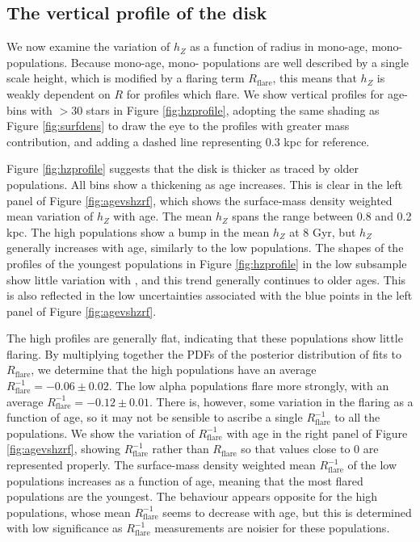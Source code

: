 \subsection{The vertical profile of the disk}
We now examine the variation of $h_Z$ as a function of radius in mono-age, mono-\feh{} populations. Because mono-age, mono-\feh{} populations are well described by a single scale height, which is modified by a flaring term $R_{\text{flare}}$, this means that $h_Z$ is weakly dependent on $R$ for profiles which flare. We show vertical profiles for age-\feh{} bins with $> 30$ stars in Figure \ref{fig:hzprofile}, adopting the same shading as Figure \ref{fig:surfdens} to draw the eye to the profiles with greater mass contribution, and adding a dashed line representing $0.3$ kpc for reference.

Figure \ref{fig:hzprofile} suggests that the disk is thicker as traced by older populations. All \feh{} bins show a thickening as age increases. This is clear in the left panel of Figure \ref{fig:agevshzrf}, which shows the surface-mass density weighted mean variation of $h_Z$ with age. The mean $h_Z$ spans the range between 0.8 and 0.2 kpc. The high \afe{} populations show a bump in the mean $h_Z$ at 8 Gyr, but $h_Z$ generally increases with age, similarly to the low \afe{} populations. The shapes of the profiles of the youngest populations in Figure \ref{fig:hzprofile} in the low \afe{} subsample show little variation with \feh{}, and this trend generally continues to older ages. This is also reflected in the low uncertainties associated with the blue points in the left panel of Figure \ref{fig:agevshzrf}. 

The high \afe{} profiles are generally flat, indicating that these populations show little flaring. By multiplying together the PDFs of the posterior distribution of fits to $R_{\mathrm{flare}}$, we determine that the high \afe{} populations have an average $R_{\mathrm{flare}}^{-1} = -0.06 \pm 0.02$. The low alpha populations flare more strongly, with an average $R_{\mathrm{flare}}^{-1} = -0.12 \pm 0.01$. There is, however, some variation in the flaring as a function of age, so it may not be sensible to ascribe a single $R_{\mathrm{flare}}^{-1}$ to all the populations. We show the variation of $R_{\mathrm{flare}}^{-1}$ with age in the right panel of Figure \ref{fig:agevshzrf}, showing $R_{\mathrm{flare}}^{-1}$ rather than $R_{\mathrm{flare}}$ so that values close to 0 are represented properly. The surface-mass density weighted mean $R_{\mathrm{flare}}^{-1}$ of the low \afe{} populations increases as a function of age, meaning that the most flared populations are the youngest. The behaviour appears opposite for the high \afe{} populations, whose mean $R_{\mathrm{flare}}^{-1}$ seems to decrease with age, but this is determined with low significance as $R_{\mathrm{flare}}^{-1}$ measurements are noisier for these populations.


